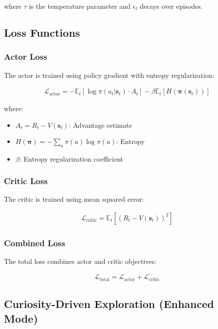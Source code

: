 \documentclass[12pt]{article}
\begin{document}
where $\tau$ is the temperature parameter and $\epsilon_t$ decays over episodes.

\subsection{Loss Functions}

\subsubsection{Actor Loss}
The actor is trained using policy gradient with entropy regularization:

\begin{align}
\mathcal{L}_{\text{actor}} = -\mathbb{E}_{t} \left[ \log \pi(a_t | \mathbf{s}_t) \cdot A_t \right] - \beta \mathbb{E}_{t} \left[ H(\boldsymbol{\pi}(\mathbf{s}_t)) \right]
\end{align}

where:
\begin{itemize}
    \item $A_t = R_t - V(\mathbf{s}_t)$: Advantage estimate
    \item $H(\boldsymbol{\pi}) = -\sum_{a} \pi(a) \log \pi(a)$: Entropy
    \item $\beta$: Entropy regularization coefficient
\end{itemize}

\subsubsection{Critic Loss}
The critic is trained using mean squared error:

\begin{align}
\mathcal{L}_{\text{critic}} = \mathbb{E}_{t} \left[ (R_t - V(\mathbf{s}_t))^2 \right]
\end{align}

\subsubsection{Combined Loss}
The total loss combines actor and critic objectives:

\begin{align}
\mathcal{L}_{\text{total}} = \mathcal{L}_{\text{actor}} + \mathcal{L}_{\text{critic}}
\end{align}

\subsection{Curiosity-Driven Exploration (Enhanced Mode)}
\end{document}
